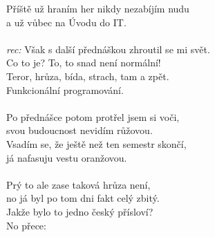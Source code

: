 \begin{Large}
Příště už hraním her nikdy nezabíjím nudu\\
a už vůbec na Úvodu do IT.
\chorus\\
\\
\emph{rec:} Však s další přednáškou zhroutil se mi svět.\\
Co to je? To, to snad není normální!\\
Teror, hrůza, bída, strach, tam a zpět.\\
Funkcionální programování.
\chorus\\
\\
Po přednášce potom protřel jsem si voči,\\
svou budoucnost nevidím růžovou.\\
Vsadím se, že ještě než ten semestr skončí,\\
já nafasuju vestu oranžovou.\\
\\
Prý to ale zase taková hrůza není,\\
no já byl po tom dni fakt celý zbitý.\\
Jakže bylo to jedno český přísloví?\\
No přece: \\
\\

\end{Large}
\newpage
